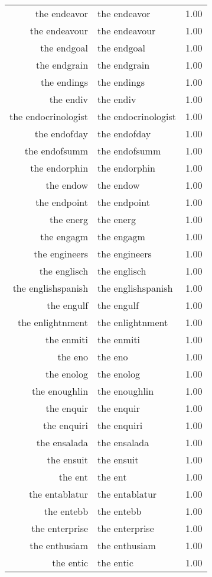 \begin{table}[ht]
\begin{tabular}{rlr}
  the endeavor & the endeavor & 1.00 \\ 
  the endeavour & the endeavour & 1.00 \\ 
  the endgoal & the endgoal & 1.00 \\ 
  the endgrain & the endgrain & 1.00 \\ 
  the endings & the endings & 1.00 \\ 
  the endiv & the endiv & 1.00 \\ 
  the endocrinologist & the endocrinologist & 1.00 \\ 
  the endofday & the endofday & 1.00 \\ 
  the endofsumm & the endofsumm & 1.00 \\ 
  the endorphin & the endorphin & 1.00 \\ 
  the endow & the endow & 1.00 \\ 
  the endpoint & the endpoint & 1.00 \\ 
  the energ & the energ & 1.00 \\ 
  the engagm & the engagm & 1.00 \\ 
  the engineers & the engineers & 1.00 \\ 
  the englisch & the englisch & 1.00 \\ 
  the englishspanish & the englishspanish & 1.00 \\ 
  the engulf & the engulf & 1.00 \\ 
  the enlightnment & the enlightnment & 1.00 \\ 
  the enmiti & the enmiti & 1.00 \\ 
  the eno & the eno & 1.00 \\ 
  the enolog & the enolog & 1.00 \\ 
  the enoughlin & the enoughlin & 1.00 \\ 
  the enquir & the enquir & 1.00 \\ 
  the enquiri & the enquiri & 1.00 \\ 
  the ensalada & the ensalada & 1.00 \\ 
  the ensuit & the ensuit & 1.00 \\ 
  the ent & the ent & 1.00 \\ 
  the entablatur & the entablatur & 1.00 \\ 
  the entebb & the entebb & 1.00 \\ 
  the enterprise & the enterprise & 1.00 \\ 
  the enthusiam & the enthusiam & 1.00 \\ 
  the entic & the entic & 1.00 \\ 

\end{tabular}
\end{table}

